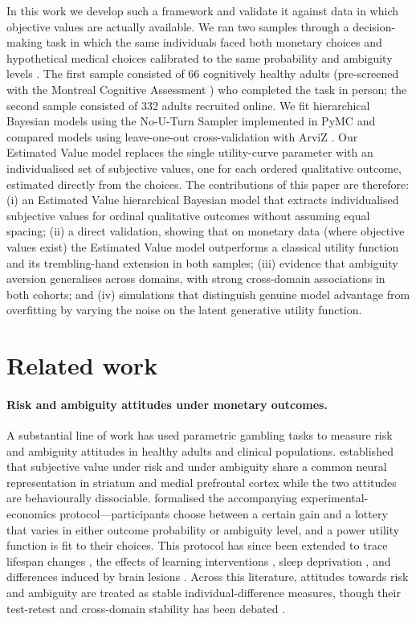 \documentclass[11pt]{article}
\begin{document}
In this work we develop such a framework and validate it against data in which objective values are actually available. We ran two samples through a decision-making task in which the same individuals faced both monetary choices and hypothetical medical choices calibrated to the same probability and ambiguity levels \citep{levy2012measuring,jia2020learning}. The first sample consisted of 66 cognitively healthy adults (pre-screened with the Montreal Cognitive Assessment \citep{nasreddine2005moca,fujiwara2010mocaj}) who completed the task in person; the second sample consisted of 332 adults recruited online. We fit hierarchical Bayesian models using the No-U-Turn Sampler \citep{hoffman2014nuts} implemented in PyMC \citep{salvatier2016pymc3} and compared models using leave-one-out cross-validation with ArviZ \citep{kumar2019arviz,vehtari2017loo}. Our Estimated Value model replaces the single utility-curve parameter with an individualised set of subjective values, one for each ordered qualitative outcome, estimated directly from the choices. The contributions of this paper are therefore: (i) an Estimated Value hierarchical Bayesian model that extracts individualised subjective values for ordinal qualitative outcomes without assuming equal spacing; (ii) a direct validation, showing that on monetary data (where objective values exist) the Estimated Value model outperforms a classical utility function and its trembling-hand extension in both samples; (iii) evidence that ambiguity aversion generalises across domains, with strong cross-domain associations in both cohorts; and (iv) simulations that distinguish genuine model advantage from overfitting by varying the noise on the latent generative utility function.

\section{Related work}

\paragraph{Risk and ambiguity attitudes under monetary outcomes.} A substantial line of work has used parametric gambling tasks to measure risk and ambiguity attitudes in healthy adults and clinical populations. \citet{levy2010neural} established that subjective value under risk and under ambiguity share a common neural representation in striatum and medial prefrontal cortex while the two attitudes are behaviourally dissociable. \citet{levy2012measuring} formalised the accompanying experimental-economics protocol---participants choose between a certain gain and a lottery that varies in either outcome probability or ambiguity level, and a power utility function is fit to their choices. This protocol has since been extended to trace lifespan changes \citep{tymula2013lifespan}, the effects of learning interventions \citep{jia2020learning}, sleep deprivation \citep{mullette2015sleep}, and differences induced by brain lesions \citep{clark2008vmpfc}. Across this literature, attitudes towards risk and ambiguity are treated as stable individual-difference measures, though their test-retest and cross-domain stability has been debated \citep{jia2020learning}.
\end{document}
